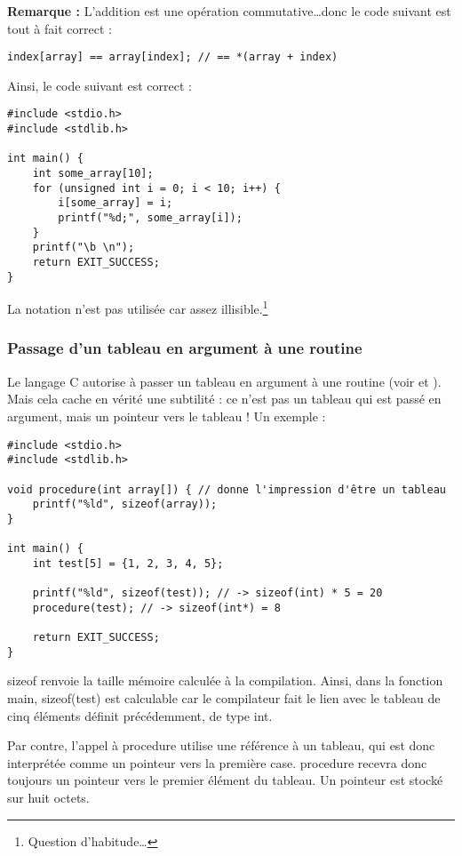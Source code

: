 \documentclass[../../../main.tex]{subfiles}
\begin{document}
\textbf{Remarque :} L'addition est une opération commutative\dots donc le code suivant est tout à fait correct :
\begin{verbatim}
index[array] == array[index]; // == *(array + index)
\end{verbatim}
Ainsi, le code suivant est correct :
\begin{verbatim}
#include <stdio.h>
#include <stdlib.h>

int main() {
	int some_array[10];
	for (unsigned int i = 0; i < 10; i++) {
		i[some_array] = i;
		printf("%d;", some_array[i]);
	}
	printf("\b \n");
	return EXIT_SUCCESS;
}
\end{verbatim}
La notation n'est pas utilisée car assez illisible.\footnote{Question d'habitude\dots}
\subsubsection{Passage d'un tableau en argument à une routine}
Le langage C autorise à passer un tableau en argument à une routine (voir  et ). Mais cela cache en vérité une subtilité : ce n'est pas un tableau qui est passé en argument, mais un pointeur vers le tableau !\newline
Un exemple :
\begin{verbatim}
#include <stdio.h>
#include <stdlib.h>

void procedure(int array[]) { // donne l'impression d'être un tableau
	printf("%ld", sizeof(array));
}

int main() {
	int test[5] = {1, 2, 3, 4, 5};
	
	printf("%ld", sizeof(test)); // -> sizeof(int) * 5 = 20
	procedure(test); // -> sizeof(int*) = 8

	return EXIT_SUCCESS;
}
\end{verbatim}
\textsf{sizeof} renvoie la taille mémoire calculée à la compilation. Ainsi, dans la fonction \textsf{main}, \textsf{sizeof(test)} est calculable car le compilateur fait le lien avec le tableau de cinq éléments définit précédemment, de type \textsf{int}.
 
Par contre, l'appel à \textsf{procedure} utilise une référence à un tableau, qui est donc interprétée comme un pointeur vers la première case. \textsf{procedure} recevra donc toujours un pointeur vers le premier élément du tableau. Un pointeur est stocké sur huit octets.
 
\end{document}

